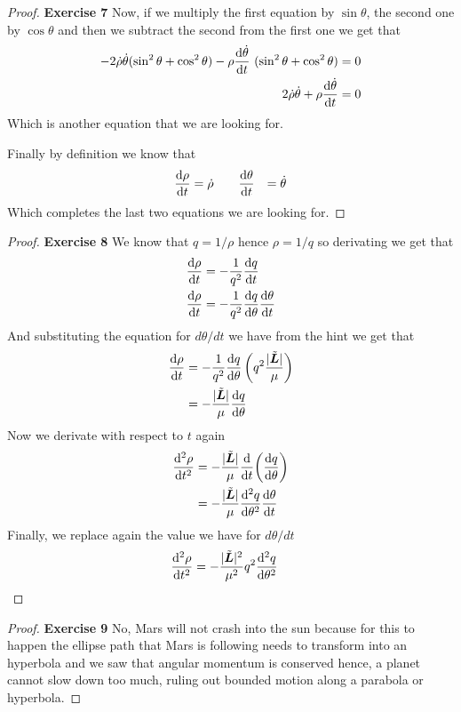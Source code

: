 \documentclass[11pt]{article}
\theoremstyle{definition}
\begin{document}
\begin{proof}{\textbf{Exercise 7}}
    Now, if we multiply the first equation by $\sin\theta$, the second one by
    $\cos\theta$ and then we subtract the second from the first one we get that
    \begin{align*}
        - 2\dot\rho\dot\theta(\sin^2\theta + \cos^2\theta)
        - \rho\dv{\dot\theta}{t}~(\sin^2\theta + \cos^2\theta)
        &= 0\\
        2\dot\rho\dot\theta + \rho\dv{\dot\theta}{t} &= 0
    \end{align*}
    Which is another equation that we are looking for.

    Finally by definition we know that
    \begin{align*}
        \dv{\rho}{t} &= \dot\rho\qquad
        \dv{\theta}{t} &= \dot\theta
    \end{align*}
    Which completes the last two equations we are looking for.
\end{proof}
\cleardoublepage
\begin{proof}{\textbf{Exercise 8}}
    We know that $q = 1/\rho$ hence $\rho = 1/q$ so derivating we get that
    \begin{align*}
        \dv{\rho}{t} &= -\frac{1}{q^2}\dv{q}{t}\\
        \dv{\rho}{t} &= -\frac{1}{q^2}\dv{q}{\theta}\dv{\theta}{t}
    \end{align*}
    And substituting the equation for $d\theta/dt$ we have from the hint
    we get that
    \begin{align*}
        \dv{\rho}{t}
        &= -\frac{1}{q^2}\dv{q}{\theta}\left(q^2\frac{|\tilde{\bm{L}}|}{\mu}\right)\\
        &=-\frac{|\tilde{\bm{L}}|}{\mu}\dv{q}{\theta}
    \end{align*}
    Now we derivate with respect to $t$ again
    \begin{align*}
        \dv[2]{\rho}{t}
        &=-\frac{|\tilde{\bm{L}}|}{\mu}\dv{t}(\dv{q}{\theta})\\
        &=-\frac{|\tilde{\bm{L}}|}{\mu}\dv[2]{q}{\theta}\dv{\theta}{t}
    \end{align*}
    Finally, we replace again the value we have for $d\theta/dt$
    \begin{align*}
        \dv[2]{\rho}{t}
        &=-\frac{|\tilde{\bm{L}}|^2}{\mu^2}q^2\dv[2]{q}{\theta}
    \end{align*}
\end{proof}
\cleardoublepage
\begin{proof}{\textbf{Exercise 9}}
    No, Mars will not crash into the sun because for this to happen the
    ellipse path that Mars is following needs to transform into an hyperbola
    and we saw that angular momentum is conserved hence, a planet cannot slow
    down too much, ruling out bounded motion along a parabola or hyperbola.
\end{proof}
\end{document}
